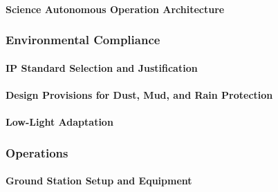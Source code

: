 \paragraph{Science Autonomous Operation Architecture}
\label{par:science_autonomous_operation_architecture}


\subsubsection{Environmental Compliance}
\label{subsubsec:environmental_compliance}

\paragraph{IP Standard Selection and Justification}
\label{par:ip_standard_selection_justification}


\paragraph{Design Provisions for Dust, Mud, and Rain Protection}
\label{par:design_provisions_dust_mud_rain_protection}


\paragraph{Low-Light Adaptation}
\label{par:rover_low_light_adaptation}


\subsubsection{Operations}
\label{subsubsec:operations}

\paragraph{Ground Station Setup and Equipment}
\label{par:ground_station_setup_equipment}


